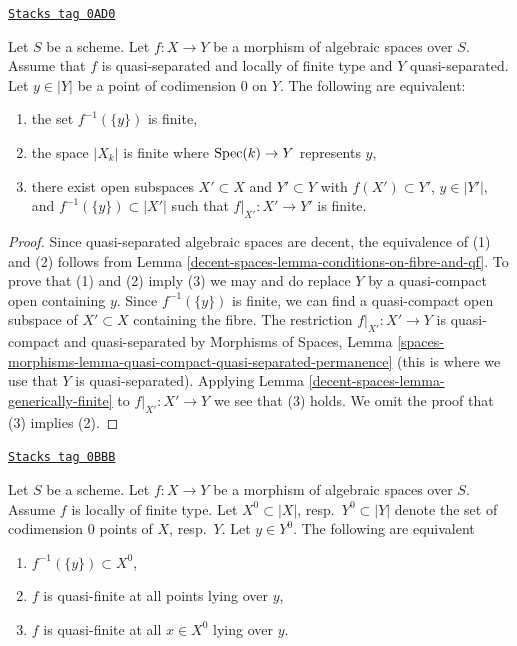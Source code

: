 \begin{lemma}
\label{decent-spaces-lemma-generically-finite-reprise}
\href{https://stacks.math.columbia.edu/tag/0AD0}{\texttt{Stacks tag 0AD0}}

Let $S$ be a scheme. Let $f : X \to Y$ be a morphism of algebraic spaces
over $S$. Assume that $f$ is quasi-separated and locally of finite type
and $Y$ quasi-separated. Let $y \in |Y|$ be a point of codimension $0$ on $Y$.
The following are equivalent:
\begin{enumerate}
\item the set $f^{-1}(\{y\})$ is finite,
\item the space $|X_k|$ is finite where $\operatorname{Spec}(k) \to Y$ represents $y$,
\item there exist open subspaces $X' \subset X$ and $Y' \subset Y$
with $f(X') \subset Y'$, $y \in |Y'|$, and $f^{-1}(\{y\}) \subset |X'|$
such that $f|_{X'} : X' \to Y'$ is finite.
\end{enumerate}
\end{lemma}

\begin{proof}
Since quasi-separated algebraic spaces are decent, the equivalence
of (1) and (2) follows from
Lemma \ref{decent-spaces-lemma-conditions-on-fibre-and-qf}.
To prove that (1) and (2) imply (3)
we may and do replace $Y$ by a quasi-compact open containing $y$.
Since $f^{-1}(\{y\})$ is finite, we can find a quasi-compact
open subspace of $X' \subset X$ containing the fibre.
The restriction $f|_{X'} : X' \to Y$ is quasi-compact and quasi-separated
by Morphisms of Spaces, Lemma
\ref{spaces-morphisms-lemma-quasi-compact-quasi-separated-permanence}
(this is where we use that $Y$ is quasi-separated).
Applying Lemma \ref{decent-spaces-lemma-generically-finite}
to $f|_{X'} : X' \to Y$ we see that (3) holds.
We omit the proof that (3) implies (2).
\end{proof}

\begin{lemma}
\label{decent-spaces-lemma-quasi-finiteness-over-generic-point}
\href{https://stacks.math.columbia.edu/tag/0BBB}{\texttt{Stacks tag 0BBB}}

Let $S$ be a scheme. Let $f : X \to Y$ be a morphism of algebraic spaces
over $S$. Assume $f$ is locally of finite type.
Let $X^0 \subset |X|$, resp.\ $Y^0 \subset |Y|$ denote the set of
codimension $0$ points of $X$, resp.\ $Y$. Let $y \in Y^0$. The following are
equivalent
\begin{enumerate}
\item $f^{-1}(\{y\}) \subset X^0$,
\item $f$ is quasi-finite at all points lying over $y$,
\item $f$ is quasi-finite at all $x \in X^0$ lying over $y$.
\end{enumerate}
\end{lemma}

